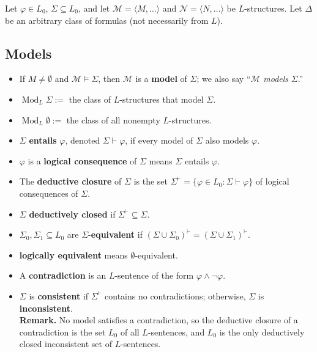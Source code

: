 \documentclass[a4paper,UKenglish,cleveref,autoref,thm-restate,12pt]{lipics-v2021-wjd}
\newcommand{\<}{\langle}
\renewcommand{\>}{\rangle}
\begin{document}
Let \(\varphi \in L_0\), \(\Sigma\subseteq L_0\), and let
\(\mathcal M = \langle M, \dots\rangle\) and
\(\mathcal N = \langle N, \dots\rangle\) be \(L\)-structures. Let
\(\Delta\) be an arbitrary class of formulas (not necessarily from
\(L\)).


\subsection{Models}\label{models}

\begin{itemize}
\item
  If \(M\neq \emptyset\) and \(\mathcal M \vDash \Sigma\), then
  \(\mathcal M\) is a \textbf{model} of \(\Sigma\); we also say
  ``\(\mathcal M\) \emph{models} \(\Sigma\).''
\item
  \(\operatorname{Mod}_L \Sigma :=\) the class of \(L\)-structures that
  model \(\Sigma\).
\item
  \(\operatorname{Mod}_L \emptyset :=\) the class of all nonempty
  \(L\)-structures.
\item
  \(\Sigma\) \textbf{entails} \(\varphi\), denoted
  \(\Sigma \vdash \varphi\), if every model of \(\Sigma\) also models
  \(\varphi\).
\item
  \(\varphi\) is a \textbf{logical consequence} of \(\Sigma\) means
  \(\Sigma\) entails \(\varphi\).
\item
  The \textbf{deductive closure} of \(\Sigma\) is the set
  \(\Sigma^{\vdash} = \{\varphi \in L_0 : \Sigma \vdash \varphi\}\) of
  logical consequences of \(\Sigma\).
\item
  \(\Sigma\) \textbf{deductively closed} if
  \(\Sigma^\vdash \subseteq \Sigma\).
\item
  \(\Sigma_0, \Sigma_1 \subseteq L_0\) are
  \(\Sigma\)-\textbf{equivalent} if
  \((\Sigma \cup \Sigma_0)^\vdash = (\Sigma \cup \Sigma_1)^\vdash\).
\item
  \textbf{logically equivalent} means \(\emptyset\)-equivalent.
\item
  A \textbf{contradiction} is an \(L\)-sentence of the form
  \(\varphi \wedge \neg \varphi\).
\item
  \(\Sigma\) is \textbf{consistent} if \(\Sigma^\vdash\) contains no
  contradictions; otherwise, \(\Sigma\) is \textbf{inconsistent}.\\
  \textbf{Remark.} No model satisfies a contradiction, so the deductive
  closure of a contradiction is the set \(L_0\) of all \(L\)-sentences,
  and \(L_0\) is the only deductively closed inconsistent set of
  \(L\)-sentences.
\end{itemize}
\end{document}
